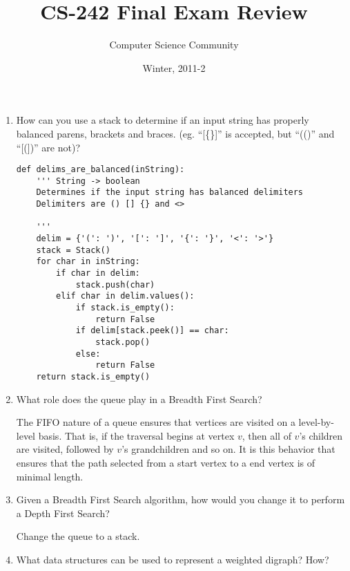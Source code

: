 \documentclass[11pt]{article}
\author{Computer Science Community}
\title{CS-242 Final Exam Review}
\date{Winter, 2011-2}
\makeatletter
\newenvironment{answer}{\large\lstset{basicstyle=\large}\color{white}}{}
\newenvironment{answer}{\large\lstset{basicstyle=\large}\color{red}}{}
\let\thetitle\@title
\let\thedate\@date
\makeatother
\begin{document}
\noindent{\Large \thetitle \hfill \thedate}

\begin{enumerate}

\item How can you use a stack to determine if an input string has properly
      balanced parens, brackets and braces. (eg. ``[\{\}]'' is accepted, but
      ``(()'' and ``[(])'' are not)?

    \begin{answer}
    \begin{lstlisting} 
def delims_are_balanced(inString):
    ''' String -> boolean
    Determines if the input string has balanced delimiters
    Delimiters are () [] {} and <>  
    
    '''
    delim = {'(': ')', '[': ']', '{': '}', '<': '>'}
    stack = Stack()
    for char in inString:
        if char in delim:
            stack.push(char)
        elif char in delim.values():
            if stack.is_empty():
                return False
            if delim[stack.peek()] == char:
                stack.pop()
            else:
                return False
    return stack.is_empty()
    \end{lstlisting}
    \end{answer}

\item What role does the queue play in a Breadth First Search?

    \begin{answer}
    The FIFO nature of a queue ensures that vertices are visited on a level-by-level basis. That is, if the traversal 
    begins at vertex $v$, then all of $v$'s children are visited, followed by $v$'s grandchildren and so on. It is
    this behavior that ensures that the path selected from a start vertex to a end vertex is of minimal length.
    \end{answer}

\item Given a Breadth First Search algorithm, how would you change it to
      perform a Depth First Search?

    \begin{answer}
    Change the queue to a stack.
    \end{answer}

\item What data structures can be used to represent a weighted  digraph? How?


\end{enumerate}
\end{document}

